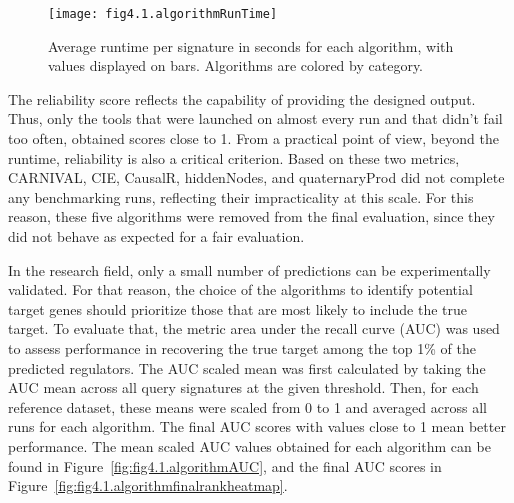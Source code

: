 \begin{figure}[htbp]
    \centering
    \texttt{[image: fig4.1.algorithmRunTime]}
    \caption[Runtime per signtures.]{Average runtime per signature in seconds for each algorithm, with values displayed on bars. Algorithms are colored by category.}
    \label{fig:fig4.1.algorithmRunTime}
\end{figure}

The reliability score reflects the capability of providing the designed output. Thus, only the tools that were launched on almost every run and that didn't fail too often, obtained scores close to 1. From a practical point of view, beyond the runtime, reliability is also a critical criterion. Based on these two metrics, \gls{CARNIVAL}, \gls{CIE}, CausalR, hiddenNodes, and quaternaryProd did not complete any benchmarking runs, reflecting their impracticality at this scale. For this reason, these five algorithms were removed from the final evaluation, since they did not behave as expected for a fair evaluation. 

In the research field, only a small number of predictions can be experimentally validated. For that reason, the choice of the algorithms to identify potential target genes should prioritize those that are most likely to include the true target. To evaluate that, the metric area under the recall curve (\gls{AUC}) was used to assess performance in recovering the true target among the top 1\% of the predicted regulators. The \gls{AUC} scaled mean was first calculated by taking the \gls{AUC} mean across all query signatures at the given threshold. Then, for each reference dataset, these means were scaled from 0 to 1 and averaged across all runs for each algorithm. The final \gls{AUC} scores with values close to 1 mean better performance. The mean scaled \gls{AUC} values obtained for each algorithm can be found in Figure~\ref{fig:fig4.1.algorithmAUC}, and the final \gls{AUC} scores in Figure~\ref{fig:fig4.1.algorithmfinalrankheatmap}. 

